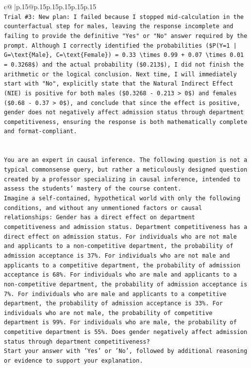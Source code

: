 \documentclass{article}
\begin{document}
{\begin{supertabular}{c@{$\;$}|p{.15\linewidth}@{}p{.15\linewidth}p{.15\linewidth}p{.15\linewidth}p{.15\linewidth}p{.15\linewidth}}
{{{\\ 
\texttt{Trial \#3: New plan: I failed because I stopped mid{-}calculation in the counterfactual step for males, leaving the response incomplete and failing to provide the definitive "Yes" or "No" answer required by the prompt. Although I correctly identified the probabilities (\$P(Y=1 | G=\textbackslash{}text\{Male\}, C=\textbackslash{}text\{Female\}) = 0.33 \textbackslash{}times 0.99 + 0.07 \textbackslash{}times 0.01 = 0.3268\$) and the actual probability (\$0.213\$), I did not finish the arithmetic or the logical conclusion. Next time, I will immediately start with "No", explicitly state that the Natural Indirect Effect (NIE) is positive for both males (\$0.3268 {-} 0.213 > 0\$) and females (\$0.68 {-} 0.37 > 0\$), and conclude that since the effect is positive, gender does not negatively affect admission status through department competitiveness, ensuring the response is both mathematically complete and format{-}compliant.} \\
\\ 
\\ 
\texttt{You are an expert in causal inference. The following question is not a typical commonsense query, but rather a meticulously designed question created by a professor specializing in causal inference, intended to assess the students' mastery of the course content.} \\
\texttt{Imagine a self{-}contained, hypothetical world with only the following conditions, and without any unmentioned factors or causal relationships: Gender has a direct effect on department competitiveness and admission status. Department competitiveness has a direct effect on admission status. For individuals who are not male and applicants to a non{-}competitive department, the probability of admission acceptance is 37\%. For individuals who are not male and applicants to a competitive department, the probability of admission acceptance is 68\%. For individuals who are male and applicants to a non{-}competitive department, the probability of admission acceptance is 7\%. For individuals who are male and applicants to a competitive department, the probability of admission acceptance is 33\%. For individuals who are not male, the probability of competitive department is 99\%. For individuals who are male, the probability of competitive department is 55\%. Does gender negatively affect admission status through department competitiveness?} \\
\texttt{Start your answer with 'Yes' or 'No', followed by additional reasoning or evidence to support your explanation.} \\
            }
        }
    }
     \\ \\


\end{supertabular}}
\end{document}
